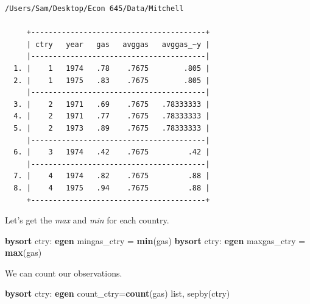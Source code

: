 \documentclass[
]{book}
\newenvironment{Shaded}{\begin{snugshade}}{\end{snugshade}}
\newcommand{\FunctionTok}[1]{\textcolor[rgb]{0.13,0.29,0.53}{\textbf{#1}}}
\newcommand{\KeywordTok}[1]{\textcolor[rgb]{0.13,0.29,0.53}{\textbf{#1}}}
\newcommand{\NormalTok}[1]{#1}
\newcommand{\OtherTok}[1]{\textcolor[rgb]{0.56,0.35,0.01}{#1}}
\begin{document}
\begin{verbatim}
/Users/Sam/Desktop/Econ 645/Data/Mitchell

     +----------------------------------------+
     | ctry   year   gas   avggas   avggas_~y |
     |----------------------------------------|
  1. |    1   1974   .78    .7675        .805 |
  2. |    1   1975   .83    .7675        .805 |
     |----------------------------------------|
  3. |    2   1971   .69    .7675   .78333333 |
  4. |    2   1971   .77    .7675   .78333333 |
  5. |    2   1973   .89    .7675   .78333333 |
     |----------------------------------------|
  6. |    3   1974   .42    .7675         .42 |
     |----------------------------------------|
  7. |    4   1974   .82    .7675         .88 |
  8. |    4   1975   .94    .7675         .88 |
     +----------------------------------------+
\end{verbatim}

Let's get the \emph{max} and \emph{min} for each country.

\begin{Shaded}
\begin{Highlighting}[]
\KeywordTok{bysort}\NormalTok{ ctry: }\KeywordTok{egen}\NormalTok{ mingas\_ctry = }\FunctionTok{min}\NormalTok{(gas)}
\KeywordTok{bysort}\NormalTok{ ctry: }\KeywordTok{egen}\NormalTok{ maxgas\_ctry = }\FunctionTok{max}\NormalTok{(gas)}
\end{Highlighting}
\end{Shaded}

We can count our observations.

\begin{Shaded}
\begin{Highlighting}[]
\KeywordTok{bysort}\NormalTok{ ctry: }\KeywordTok{egen}\NormalTok{ count\_ctry=}\FunctionTok{count}\NormalTok{(gas)}
\OtherTok{list}\NormalTok{, sepby(ctry)}
\end{Highlighting}
\end{Shaded}
\end{document}
